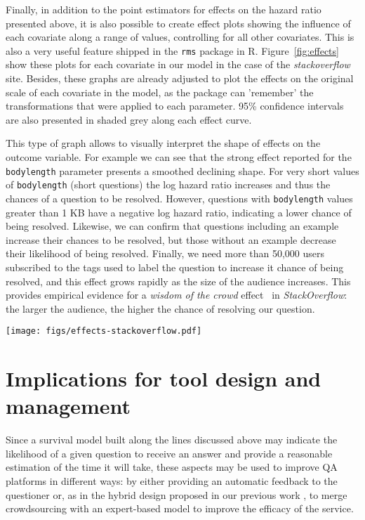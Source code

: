 \documentclass{chi2012}
\begin{document}
Finally, in addition to the point estimators for effects on the hazard ratio presented
above, it is also possible to create effect plots showing the influence of each
covariate along a range of values, controlling for all other covariates. This is also
a very useful feature shipped in the \texttt{rms} package in R. Figure~\ref{fig:effects}
show these plots for each covariate in our model in the case of the \textit{stackoverflow}
site. Besides, these graphs are already adjusted to plot the effects on the original
scale of each covariate in the model, as the package can 'remember' the transformations
that were applied to each parameter. 95\% confidence intervals are also presented in
shaded grey along each effect curve.

This type of graph allows to visually interpret the shape of effects on the
outcome variable. For example we can see that the strong effect reported for the
\texttt{bodylength} parameter presents a smoothed declining shape. For very short
values of \texttt{bodylength} (short questions) the log hazard ratio increases and thus
the chances of a question to be resolved. However, questions with \texttt{bodylength}
values greater than 1 KB have a negative log hazard ratio, indicating a lower chance
of being resolved. Likewise, we can confirm that questions including an example increase
their chances to be resolved, but those without an example decrease their likelihood
of being resolved. Finally, we need more than 50,000 users subscribed to the tags
used to label the question to increase it chance of being resolved, and this effect
grows rapidly as the size of the audience increases. This provides empirical evidence
for a \textit{wisdom of the crowd} effect~\cite{surowiecki2005} in \textit{StackOverflow}:
the larger the audience, the higher the chance of resolving our question.

\begin{figure*}[t]
\centering
\texttt{[image: figs/effects-stackoverflow.pdf]}
\caption{Plots of effects of covariates included in the model on the log hazard ratio for the \texttt{stackoverflow} site.}
\label{fig:effects}
\end{figure*}

\section{Implications for tool design and management}

Since a survival model built along the lines discussed above may indicate the likelihood 
of a given question to receive an answer and provide a reasonable estimation of the 
time it will take, these aspects may be used to improve QA platforms in different 
ways: by either providing an automatic feedback to the questioner or, as in the hybrid design proposed in our previous work \cite{piccardi2014}, to merge crowdsourcing with an expert-based model to improve the efficacy of the service.
\end{document}
